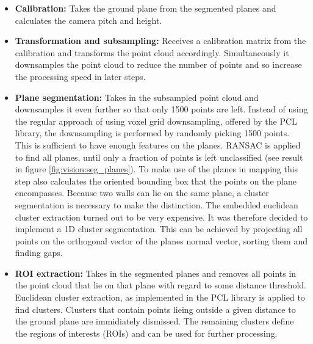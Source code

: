 \begin{itemize}
\item \textbf{Calibration:}
Takes the ground plane from the segmented planes and calculates the camera pitch and height.

\item \textbf{Transformation and subsampling:}
Receives a calibration matrix from the calibration and transforms the point cloud accordingly.
Simultaneously it downsamples the point cloud to reduce the number of points and so increase the processing speed in later steps.

\item \textbf{Plane segmentation:}
Takes in the subsampled point cloud and downsamples it even further so that only 1500 points are left.
Instead of using the regular approach of using voxel grid downsampling, offered by the PCL library,
the downsampling is performed by randomly picking 1500 points.
This is sufficient to have enough features on the planes.
RANSAC is applied to find all planes, until only a fraction of points is left unclassified (see result in figure \ref{fig:vision:seg_planes}).
To make use of the planes in mapping this step also calculates the oriented bounding box that the points on the plane encompasses.
Because two walls can lie on the same plane, a cluster segmentation is necessary to make the distinction.
The embedded euclidean cluster extraction turned out to be very expensive.
It was therefore decided to implement a 1D cluster segmentation. 
This can be achieved by projecting all points on the orthogonal vector of the planes normal vector, sorting them and finding gaps.

\item \textbf{ROI extraction:}
Takes in the segmented planes and removes all points in the point cloud that lie on that plane with regard to some distance threshold.
Euclidean cluster extraction, as implemented in the PCL library is applied to find clusters. 
Clusters that contain points lieing outside a given distance to the ground plane are immidiately dismissed.
The remaining clusters define the regions of interests (ROIs) and can be used for further processing.
\end{itemize}

